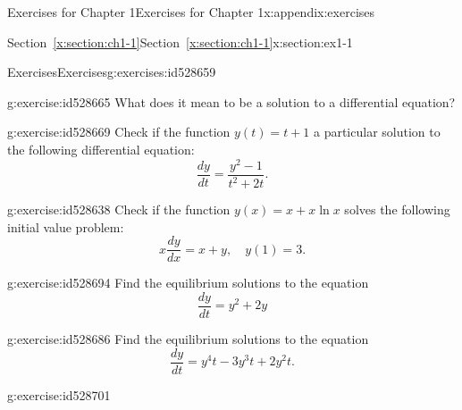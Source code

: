 \documentclass[oneside,10pt,]{book}
\newcommand{\xreffont}{\relax}
\numberwithin{equation}{section}
\numberwithin{equation}{section}
\begin{document}
\begin{appendixptx}{Exercises for Chapter 1}{}{Exercises for Chapter 1}{}{}{x:appendix:exercises}
%
%
\typeout{************************************************}
\typeout{Section B.1 Section~{\xreffont\ref*{x:section:ch1-1}}}
\typeout{************************************************}
%
\begin{sectionptx}{Section~{\xreffont\ref*{x:section:ch1-1}}}{}{Section~{\xreffont\ref*{x:section:ch1-1}}}{}{}{x:section:ex1-1}
%
%
\typeout{************************************************}
\typeout{************************************************}
%
\begin{exercises-subsection-numberless}{Exercises}{}{Exercises}{}{}{g:exercises:id528659}
\begin{divisionexercise}{1}{}{}{g:exercise:id528665}%
What does it mean to be a solution to a differential equation?%
\end{divisionexercise}%
\begin{divisionexercise}{2}{}{}{g:exercise:id528669}%
Check if the function \(y(t)=t+1\) a particular solution to the following differential equation:%
\begin{equation*}
\frac{dy}{dt}=\frac{y^{2}-1}{t^{2}+2t}.
\end{equation*}
%
\end{divisionexercise}%
\begin{divisionexercise}{3}{}{}{g:exercise:id528638}%
Check if the function \(y(x)=x+x\ln x\) solves the following initial value problem:%
\begin{equation*}
x\frac{dy}{dx}=x+y,\,\,\,\,\,\,y(1)=3.
\end{equation*}
%
\end{divisionexercise}%
\begin{divisionexercise}{4}{}{}{g:exercise:id528694}%
Find the equilibrium solutions to the equation%
\begin{equation*}
\frac{dy}{dt}=y^{2}+2y
\end{equation*}
%
\end{divisionexercise}%
\begin{divisionexercise}{5}{}{}{g:exercise:id528686}%
Find the equilibrium solutions to the equation%
\begin{equation*}
\frac{dy}{dt}=y^{4}t-3y^{3}t+2y^{2}t.
\end{equation*}
%
\end{divisionexercise}%
\begin{divisionexercise}{6}{}{}{g:exercise:id528701}%

\end{divisionexercise}
\end{exercises-subsection-numberless}
\end{sectionptx}
\end{appendixptx}
\end{document}
